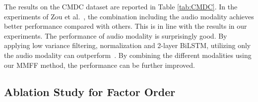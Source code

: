 \documentclass{article}
\begin{document}
The results on the CMDC dataset are reported in Table \ref{tab:CMDC}. In the experiments of Zou et al.~\cite{CMDC}, the combination including the audio modality achieves better performance compared with others. This is in line with the results in our experiments. The performance of audio modality is surprisingly good. By applying low variance filtering, normalization and 2-layer BiLSTM, utilizing only the audio modality can outperform~\cite{CMDC}.
By combining the different modalities using our MMFF method, the performance can be further improved.

\begin{table}[!t]
   	\centering
   	\caption{Result on CMDC Test Set, where the best results are marked in bold; ``(A)'' and ``(A+T)'' indicate that the model only uses the corresponding modalities. If not specified, all modalities are utilized.} 
   	\label{tab:CMDC}
\end{table}
   	
\subsection{Ablation Study for Factor Order}
\end{document}
